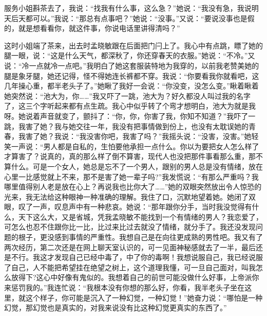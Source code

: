 \documentclass[12pt,oneside]{book}
\begin{document}
服务小姐斟茶去了，我说：``找我有什么事，这么急？''她说：``我没有急，我说明天后天都可以。''我说：``那总有点事吧？''她说：``没事。''又说：``要说没事也是假的，就是想看看你，就这件事，你说电话里讲得清吗？''

这时小姐端了茶来，出去时孟晓敏跟在后面把门闩上了。我心中有点跳，瞟了她的腿一眼，说：``这是什么天气，都深秋了，你还穿春天的衣服。''她说：``不冷。''又说：``冷一点就冷一点吧。''我明白了她这套服装特地为我穿的，以前我老赞美她的腿是象牙腿，她还记得，怪不得她连长裤都不穿。我说：``你要看我你就看吧，这几年操心重，都半老头子了。''她瞅了我好一会说：``你没变，没怎么变。''瞅着瞅着她突然说：``池大为，你\ldots\ldots{}''我又吓了一跳，池大为？好久都没人叫过我的名字了，这三个字听起来都有点生疏。我心中似乎转了个弯才想明白，池大为就是我呀。她说着声音就变了，颤抖了：``你，你，你害了我，你知不知道？''我吓了一跳，我害了她？我与她交往一年，我没有把事情做到份上，也没有太耽误她的青春，我害了她？我说：``我没害你吧，我害了吗？''我摇头说：``没害，没害。''她轻笑一声说：``男人都是自私的，生怕要他承担一点什么。你以为要把女人怎么样了才算害了？说真的，真的那么样了倒不算害，现代人也没把那件事看那么重，那不算什么。可是一个女人，她总是忘不了一个男人，跟别的男人总是没有情绪，放在心里一比感觉就上不来，那不是害了她一辈子吗?''我发慌说：``有那么严重吗？我哪里值得别人老是放在心上？再说我也比你大了\ldots\ldots{}''她的双眼突然放出令人惊恐的光来，我无法给这种眼神一种准确的理解。我住了口，沉默地望着她。她闭了双眼，叹了一声，叹息声中有一种悲哀。她说：``那年跟你分手，当时我没觉得有什么，天下这么大，又是省城，凭我孟晓敏不能找到一个有情绪的男人？我恋爱了，可怎么也忍不住跟你比一比，比过来比过去就没了情绪，就分手了。我还没发现问题的根子，更没感到事情的严重性。我想自己是在向往更成熟的男性吧。我又有了两次经历，第二次还是在网上聊天室认识的，可一见面神秘感就去了一半，最后还是不行。我这才发现自己已经中毒了，中了你的毒啊！我想说服自己，我已经说服了自己，人不能把希望挂在绝望之树上，这个道理我懂，可一旦自己面对，叫我怎么放得下?这心中好像有鬼似的。我想着自己的前世可能没做什么好事，上帝派你来惩罚我的。''我连忙说：``我根本没有你想的那么好，你看，我半老头子坐在这里，就这个样子，你可能是沉入了一种幻觉，一种幻觉！''她奋力说：``哪怕是一种幻觉，那幻觉也是真实的，对我来说没有比这种幻觉更真实的东西了。''
\end{document}

